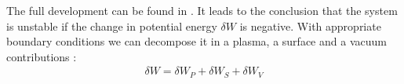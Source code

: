 The full development can be found in \cite{freidberg,boyd-sanderson}. It leads to the conclusion that the system is unstable if the change in potential energy $\delta W$ is negative. With appropriate boundary conditions we can decompose it in a plasma, a surface and a vacuum contributions \cite{boyd-sanderson}:
\begin{align*}
	\delta W = \delta W_P + \delta W_S + \delta W_V
\end{align*}

